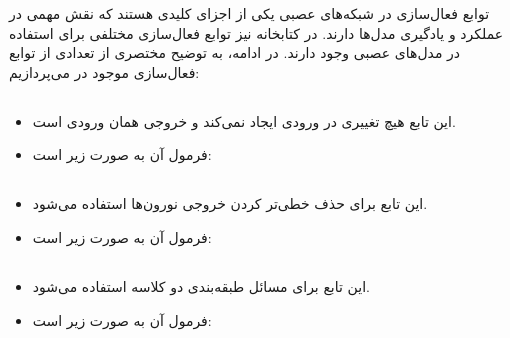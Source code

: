 \documentclass[12pt, dvipsnames, svgnames, x11names,]{article}
\begin{document}
		توابع فعال‌سازی در شبکه‌های عصبی یکی از اجزای کلیدی هستند که نقش مهمی در عملکرد و یادگیری مدل‌ها دارند. در کتابخانه  نیز توابع فعال‌سازی مختلفی برای استفاده در مدل‌های عصبی وجود دارند. در ادامه، به توضیح مختصری از تعدادی از توابع فعال‌سازی موجود در  می‌پردازیم:
	
		
		\subsection{}
		
			\begin{itemize}
				
				\item این تابع هیچ تغییری در ورودی ایجاد نمی‌کند و خروجی همان ورودی است.
				
				\item فرمول آن به صورت زیر است:
				\begin{center}
				\end{center}
				
			\end{itemize}
			
		\subsection{}
				
			\begin{itemize}
				
				\item این تابع برای حذف خطی‌تر کردن خروجی نورون‌ها استفاده می‌شود.
				
				
				\item فرمول آن به صورت زیر است:
				
				\begin{center}
				\end{center}
				
			\end{itemize}
		
		\subsection{}
		
			\begin{itemize}
				
				\item این تابع برای مسائل طبقه‌بندی دو کلاسه استفاده می‌شود.
				
				\item فرمول آن به صورت زیر است:
				
				\begin{center}
				\end{center}
				
				
			\end{itemize}
		
\end{document}
